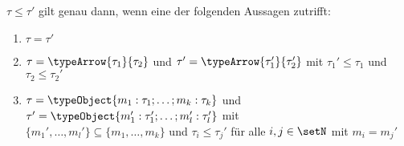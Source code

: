\begin{lemma} \label{lemma:Subtyping:Subtyping_Lemma}
  $\tau \le \tau'$ gilt genau dann, wenn eine der folgenden Aussagen zutrifft:
  \begin{enumerate}
    \item $\tau = \tau'$
    \item $\tau = \typeArrow{\tau_1}{\tau_2}$ und $\tau' = \typeArrow{\tau_1'}{\tau_2'}$ mit
          $\tau_1' \le \tau_1$ und $\tau_2 \le \tau_2'$
    \item $\tau = \typeObject{m_1:\tau_1;\ldots;m_k:\tau_k}$ und
          $\tau' = \typeObject{m_1':\tau_1';\ldots;m_l':\tau_l'}$ mit \\
          $\{m_1',\ldots,m_l'\}\subseteq\{m_1,\ldots,m_k\}$ und $\tau_i \le \tau_j'$ f\"ur alle
          $i,j\in\setN$ mit $m_i = m_j'$
  \end{enumerate}
\end{lemma}

